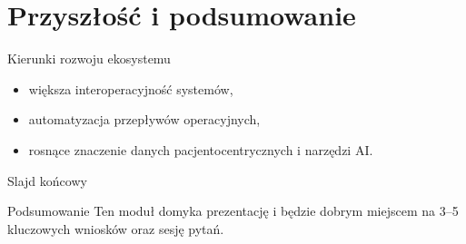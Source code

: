 \section{Przyszłość i podsumowanie}


\begin{frame}{Kierunki rozwoju ekosystemu}
  \begin{itemize}
    \item większa interoperacyjność systemów,
    \item automatyzacja przepływów operacyjnych,
    \item rosnące znaczenie danych pacjentocentrycznych i narzędzi AI.
  \end{itemize}
\end{frame}

\begin{frame}{Slajd końcowy}
  \begin{block}{Podsumowanie}
    Ten moduł domyka prezentację i będzie dobrym miejscem na 3--5 kluczowych wniosków oraz sesję pytań.
  \end{block}
\end{frame}
